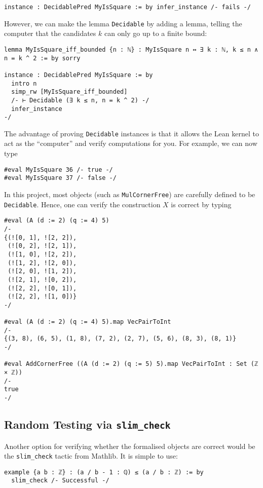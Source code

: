 \begin{verbatim}
instance : DecidablePred MyIsSquare := by infer_instance /- fails -/
\end{verbatim}

However, we can make the lemma \texttt{Decidable} by adding a lemma, telling the computer that the candidates \(k\) can only go up to a finite bound:

\begin{verbatim}
lemma MyIsSquare_iff_bounded {n : ℕ} : MyIsSquare n ↔ ∃ k : ℕ, k ≤ n ∧ n = k ^ 2 := by sorry

instance : DecidablePred MyIsSquare := by
  intro n
  simp_rw [MyIsSquare_iff_bounded]
  /- ⊢ Decidable (∃ k ≤ n, n = k ^ 2) -/
  infer_instance
-/
\end{verbatim}

The advantage of proving \texttt{Decidable} instances is that it allows the Lean kernel to act as the ``computer'' and verify computations for you. For example, we can now type

\begin{verbatim}
#eval MyIsSquare 36 /- true -/
#eval MyIsSquare 37 /- false -/
\end{verbatim}

In this project, most objects (such as \texttt{MulCornerFree}) are carefully defined to be \texttt{Decidable}. Hence, one can verify the construction \(X\) is correct by typing

\begin{verbatim}
#eval (A (d := 2) (q := 4) 5)
/-
{(![0, 1], ![2, 2]),
 (![0, 2], ![2, 1]),
 (![1, 0], ![2, 2]),
 (![1, 2], ![2, 0]),
 (![2, 0], ![1, 2]),
 (![2, 1], ![0, 2]),
 (![2, 2], ![0, 1]),
 (![2, 2], ![1, 0])}
-/

#eval (A (d := 2) (q := 4) 5).map VecPairToInt
/-
{(3, 8), (6, 5), (1, 8), (7, 2), (2, 7), (5, 6), (8, 3), (8, 1)}
-/

#eval AddCornerFree ((A (d := 2) (q := 5) 5).map VecPairToInt : Set (ℤ × ℤ))
/-
true
-/
\end{verbatim}

\subsection{Random Testing via \texttt{slim_check}}

Another option for verifying whether the formalised objects are correct would be the \texttt{slim_check} tactic from Mathlib. It is simple to use:

\begin{verbatim}
example {a b : ℤ} : (a / b - 1 : ℚ) ≤ (a / b : ℤ) := by
  slim_check /- Successful -/
\end{verbatim}
